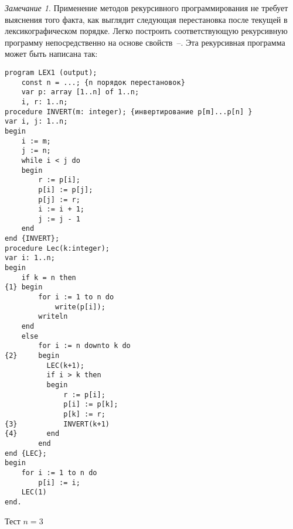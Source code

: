 \documentclass[12pt,a4paper]{article}
\theoremstyle{plain}
\theoremstyle{definition}
\theoremstyle{remark}
\newtheorem*{remark}{Замечание}
\newtheorem*{comment}{Комментарий}
\begin{document}
\begin{remark}
Применение методов рекурсивного программирования не требует выяснения того факта, как выглядит следующая перестановка после текущей в лексикографическом порядке. Легко построить соответствующую рекурсивную программу непосредственно на основе свойств~--. Эта рекурсивная программа может быть написана так:
\end{remark}

\begin{verbatim}
program LEX1 (output);
    const n = ...; {n порядок перестановок}
    var p: array [1..n] of 1..n;
    i, r: 1..n;
procedure INVERT(m: integer); {инвертирование p[m]...p[n] }
var i, j: 1..n;
begin
    i := m;
    j := n;
    while i < j do
    begin 
        r := p[i];
        p[i] := p[j];
        p[j] := r;
        i := i + 1;
        j := j - 1
    end
end {INVERT};
procedure Lec(k:integer);
var i: 1..n;
begin
    if k = n then
{1} begin
        for i := 1 to n do 
            write(p[i]);
        writeln
    end
    else
        for i := n downto k do
{2}     begin
          LEC(k+1);
          if i > k then
          begin
              r := p[i];
              p[i] := p[k];
              p[k] := r;
{3}           INVERT(k+1)
{4}       end
        end
end {LEC};
begin
    for i := 1 to n do
        p[i] := i;
    LEC(1)
end.
\end{verbatim}

\begin{comment}
Процедура \verb@INVERT@ служит для восстановления первоначальной перестановки (свойство~\nameref{L1}) после генерации всех перестановок данного обобщенного блока. Процедура \verb@LEC@ осуществляет либо печать перестановки (строка \verb@{1}@), если все $n$ позиций уже сформированы, либо (по свойству~\nameref{L2}) генерирует перестановки $n-k+1$ порядка как последовательность $n-k+1$ блоков перестановок $n-k$ порядка с возрастающим по значению элементом на $k$ позиции.
\end{comment}

Тест $n=3$
\end{document}
